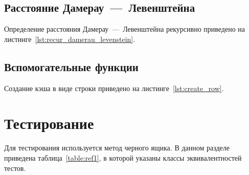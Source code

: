 \subsection{Расстояние Дамерау~---~Левенштейна}
Определение расстояния Дамерау~---~Левенштейна рекурсивно приведено на листинге~\ref{lst:recur_damerau_levenstein}.



\subsection{Вспомогательные функции}
Создание кэша в виде строки приведено на листинге~\ref{lst:create_row}.


\section{Тестирование}
Для тестирования используется метод черного ящика. В данном разделе приведена таблица~\ref{table:ref1}, в которой указаны классы эквивалентностей тестов. \\

